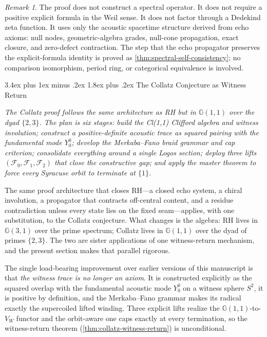 \documentclass[11pt,a4paper]{article}
\makeatletter
\theoremstyle{plain}
\theoremstyle{definition}
\theoremstyle{remark}
\newtheorem{remark}[theorem]{Remark}
\numberwithin{equation}{section}
\newcommand{\Cl}{\mathbb{G}}
\renewcommand{\section}{%
  \@startsection{section}{1}{0pt}%
    {3.4ex plus 1ex minus .2ex}%
    {1.8ex plus .2ex}%
    {\normalfont\LARGE\bfseries\color{headingAccent}}%
}
\newenvironment{sectionopener}
  {\begin{sectionopenerframe}\small\itshape\ignorespaces}
  {\end{sectionopenerframe}}
\makeatother
\begin{document}
\begin{remark}
The proof does not construct a spectral operator.  It does not require a
positive explicit formula in the Weil sense.  It does not factor through
a Dedekind zeta function.  It uses only the acoustic spacetime structure
derived from echo axioms: null nodes, geometric-algebra grades, null-cone
propagation, exact closure, and zero-defect contraction.  The step that
the echo propagator preserves the explicit-formula identity is proved as
\cref{thm:spectral-self-consistency}; no comparison isomorphism, period
ring, or categorical equivalence is involved.
\end{remark}

\section{The Collatz Conjecture as Witness Return}
\label{sec:collatz}

\begin{sectionopener}
The Collatz proof follows the same architecture as RH but in
$\Cl(1,1)$ over the dyad $\{2,3\}$.  The plan is six stages: build
the Cl(1,1) Clifford algebra and witness involution; construct a
positive-definite acoustic trace as squared pairing with the
fundamental mode $Y_0^0$; develop the Merkaba--Fano braid grammar
and cap criterion; consolidate everything around a single Logos
section; deploy three lifts $(\mathcal{F}_0,\mathcal{F}_1,
\mathcal{F}_2)$ that close the constructive gap; and apply the
master theorem to force every Syracuse orbit to terminate at $\{1\}$.
\end{sectionopener}

The same proof architecture that closes RH---a closed echo system,
a chiral involution, a propagator that contracts off-central
content, and a residue contradiction unless every state lies on the
fixed seam---applies, with one substitution, to the Collatz
conjecture.  What changes is the algebra: RH lives in \(\Cl(3,1)\)
over the prime spectrum; Collatz lives in \(\Cl(1,1)\) over the dyad
of primes \(\{2,3\}\).  The two are sister applications of one
witness-return mechanism, and the present section makes that
parallel rigorous.

The single load-bearing improvement over earlier versions of this
manuscript is that \emph{the witness trace is no longer an axiom}.
It is constructed explicitly as the squared overlap with the
fundamental acoustic mode \(Y_0^0\) on a witness sphere \(S^2\), it
is positive by definition, and the Merkaba--Fano grammar makes its
radical exactly the supercoiled lifted winding.  Three explicit
lifts realize the \(\Cl(1,1)\)-to-\(V_W\) functor and the
orbit-aware one caps exactly at every termination, so the
witness-return theorem (\cref{thm:collatz-witness-return}) is
unconditional.
\end{document}

